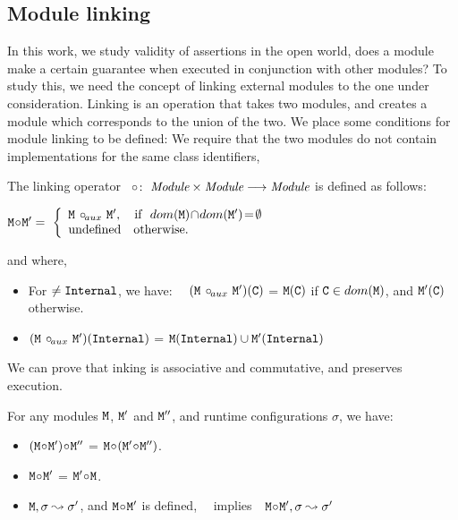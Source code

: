 \subsection{Module linking}

In this work, we study validity of assertions in the open world, \ie   does a module 
make a certain guarantee when executed in conjunction with other modules? To study this, we 
 need the concept of linking external modules to the one  under consideration.
 Linking is an operation that takes two modules, and creates a module which corresponds  to the union of the two. 
We place some conditions for module linking to be defined: We require that the two modules do not contain implementations for the same class identifiers,  

\begin{definition}

The linking operator\  \ $\link:\  \syntax{Module} \times  \syntax{Module} \longrightarrow \syntax{Module}$ is defined as follows:

$
\M \link \M{'}  =\ \left\{
\begin{array}{l}
                        \M\ \link\!_{aux}\ \M{'},\ \ \   \hbox{if}\  \ dom(\M)\!\cap\!dom(\M')\!=\!\emptyset\\
\mbox{undefined}  \ \ \ \mbox{otherwise.}
\end{array}
                    \right.$
                    
and where,                  
\begin{itemize}
     \item 
   For $\neq\prg{Internal}$, we have: \ \
   $(\M\ \link\!_{aux}\ \M')(\prg{C})$ = $\M(\prg{C})$  if  $\prg{C}\in dom(\M)$, and  $\M'(\prg{C})$ otherwise.
    \item  
   $(\M\ \link\!_{aux}\ \M')(\prg{Internal})$ = $ \M(\prg{Internal}) \cup  \M'(\prg{Internal})$
 \end{itemize}
\end{definition}

We can prove that inking is associative and commutative, and preserves execution.
 
 \begin{lemma}
 For any modules $\M$,   $\M'$ and $\M''$, and runtime configurations $\sigma$, we have$:$
 \label{lemma:linking:properties}
 
 \begin{itemize}
     \item 
     $(\M \link \M')\link \M''$ = $\M \link (\M' \link \M'')$.
    \item  
      $\M \link \M'$  = $\M' \link\M$.
      \item
      $\M, \sigma \leadsto \sigma'$, and $\M\link \M'$ is defined, \  \  implies\ \   $\M\link \M', \sigma \leadsto \sigma'$
   \end{itemize}
 
 \end{lemma}
 
